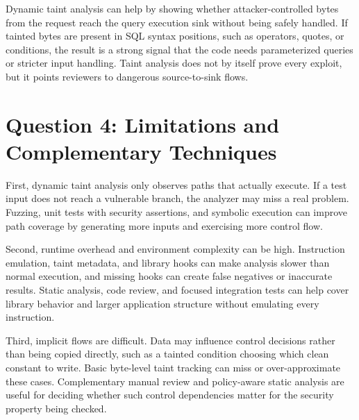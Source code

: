 \documentclass[11pt]{article}
\begin{document}
Dynamic taint analysis can help by showing whether attacker-controlled bytes
from the request reach the query execution sink without being safely handled. If
tainted bytes are present in SQL syntax positions, such as operators, quotes, or
conditions, the result is a strong signal that the code needs parameterized
queries or stricter input handling. Taint analysis does not by itself prove
every exploit, but it points reviewers to dangerous source-to-sink flows.

\section*{Question 4: Limitations and Complementary Techniques}

First, dynamic taint analysis only observes paths that actually execute. If a
test input does not reach a vulnerable branch, the analyzer may miss a real
problem. Fuzzing, unit tests with security assertions, and symbolic execution
can improve path coverage by generating more inputs and exercising more control
flow.

Second, runtime overhead and environment complexity can be high. Instruction
emulation, taint metadata, and library hooks can make analysis slower than
normal execution, and missing hooks can create false negatives or inaccurate
results. Static analysis, code review, and focused integration tests can help
cover library behavior and larger application structure without emulating every
instruction.

Third, implicit flows are difficult. Data may influence control decisions rather
than being copied directly, such as a tainted condition choosing which clean
constant to write. Basic byte-level taint tracking can miss or over-approximate
these cases. Complementary manual review and policy-aware static analysis are
useful for deciding whether such control dependencies matter for the security
property being checked.
\end{document}
